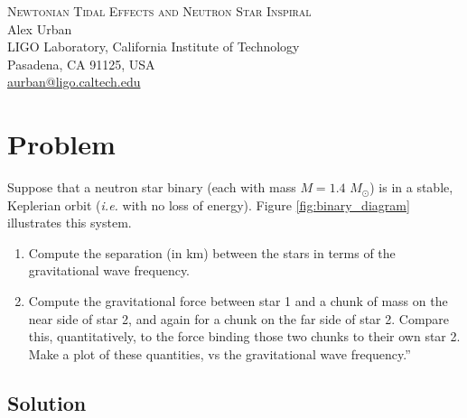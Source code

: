 \documentclass[11pt]{article}
\begin{document}
\begin{center}
{\Large\textsc{Newtonian Tidal Effects and Neutron Star Inspiral}} \\
\vspace{10pt}
{\large Alex Urban} \\
{\small LIGO Laboratory, California Institute of Technology \\
Pasadena, CA 91125, USA \\
\href{mailto:aurban@ligo.caltech.edu}{aurban@ligo.caltech.edu}}
\end{center}

\section{Problem}
Suppose that a neutron star binary (each with mass $M = 1.4\,\, M_{\odot}$) is in a stable, Keplerian orbit (\textit{i.e.} with no loss of energy). Figure \ref{fig:binary_diagram} illustrates this system.

\begin{enumerate}
\item Compute the separation (in km) between the stars in terms of the gravitational wave frequency.

\item Compute the gravitational force between star 1 and a chunk of mass on the near side of star 2, and again for a chunk on the far side of star 2. Compare this, quantitatively, to the force binding those two chunks to their own star 2. Make a plot of these quantities, vs the gravitational wave frequency.”
\end{enumerate}

\subsection*{Solution}
\end{document}

